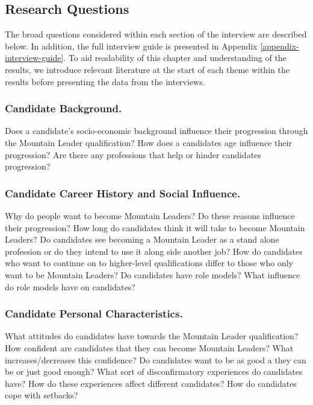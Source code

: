 \documentclass[
  12pt,
  a4paper,
]{book}
\begin{document}
\hypertarget{research-questions}{%
\subsection{Research Questions}\label{research-questions}}

The broad questions considered within each section of the interview are described below. In addition, the full interview guide is presented in Appendix \ref{appendix-interview-guide}. To aid readability of this chapter and understanding of the results, we introduce relevant literature at the start of each theme within the results before presenting the data from the interviews.

\hypertarget{candidate-background.}{%
\subsubsection{Candidate Background.}\label{candidate-background.}}

Does a candidate's socio-economic background influence their progression through the Mountain Leader qualification? How does a candidates age influence their progression? Are there any professions that help or hinder candidates progression?

\hypertarget{candidate-career-history-and-social-influence.}{%
\subsubsection{Candidate Career History and Social Influence.}\label{candidate-career-history-and-social-influence.}}

Why do people want to become Mountain Leaders? Do these reasons influence their progression? How long do candidates think it will take to become Mountain Leaders? Do candidates see becoming a Mountain Leader as a stand alone profession or do they intend to use it along side another job? How do candidates who want to continue on to higher-level qualifications differ to those who only want to be Mountain Leaders? Do candidates have role models? What influence do role models have on candidates?

\hypertarget{candidate-personal-characteristics.}{%
\subsubsection{Candidate Personal Characteristics.}\label{candidate-personal-characteristics.}}

What attitudes do candidates have towards the Mountain Leader qualification? How confident are candidates that they can become Mountain Leaders? What increases/decreases this confidence? Do candidates want to be as good a they can be or just good enough? What sort of disconfirmatory experiences do candidates have? How do these experiences affect different candidates? How do candidates cope with setbacks?
\end{document}
